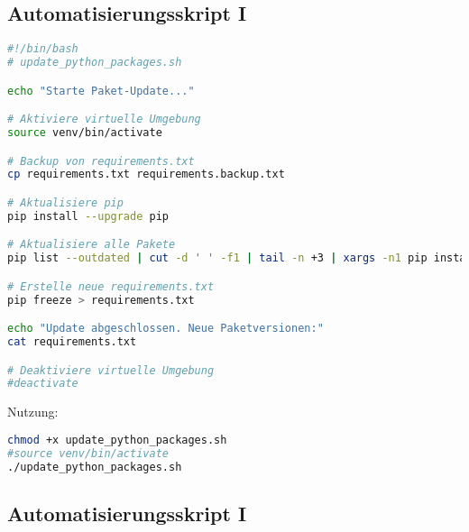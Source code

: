\documentclass{vorlage-design-main}
\begin{document}
\subsection{Automatisierungsskript I}\label{automatisierungsskript-i}

\begin{lstlisting}[language=bash]
#!/bin/bash
# update_python_packages.sh

echo "Starte Paket-Update..."

# Aktiviere virtuelle Umgebung
source venv/bin/activate

# Backup von requirements.txt
cp requirements.txt requirements.backup.txt

# Aktualisiere pip
pip install --upgrade pip

# Aktualisiere alle Pakete
pip list --outdated | cut -d ' ' -f1 | tail -n +3 | xargs -n1 pip install -U

# Erstelle neue requirements.txt
pip freeze > requirements.txt

echo "Update abgeschlossen. Neue Paketversionen:"
cat requirements.txt

# Deaktiviere virtuelle Umgebung
#deactivate
\end{lstlisting}

Nutzung:

\begin{lstlisting}[language=bash]
chmod +x update_python_packages.sh
#source venv/bin/activate
./update_python_packages.sh
\end{lstlisting}

\subsection{Automatisierungsskript I}\label{automatisierungsskript-i-1}
\end{document}
